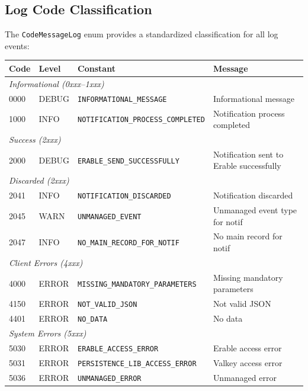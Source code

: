 \subsection{Log Code Classification}

The \texttt{CodeMessageLog} enum provides a standardized classification for all log events:

\begin{center}
    \begin{tabularx}{\textwidth}{|l|l|l|X|}
\toprule
\textbf{Code} & \textbf{Level} & \textbf{Constant} & \textbf{Message} \\
\midrule
\multicolumn{4}{|l|}{\textit{Informational (0xxx--1xxx)}} \\
\hline
0000 & DEBUG & \texttt{INFORMATIONAL\_MESSAGE} & Informational message \\ \hline
1000 & INFO & \texttt{NOTIFICATION\_PROCESS\_COMPLETED} & Notification process completed \\
\midrule
\multicolumn{4}{|l|}{\textit{Success (2xxx)}} \\
\hline
2000 & DEBUG & \texttt{ERABLE\_SEND\_SUCCESSFULLY} & Notification sent to Erable successfully \\
\midrule
\multicolumn{4}{|l|}{\textit{Discarded (2xxx)}} \\
\hline
2041 & INFO & \texttt{NOTIFICATION\_DISCARDED} & Notification discarded \\ \hline
2045 & WARN & \texttt{UNMANAGED\_EVENT} & Unmanaged event type for notif \\ \hline
2047 & INFO & \texttt{NO\_MAIN\_RECORD\_FOR\_NOTIF} & No main record for notif \\
\midrule
\multicolumn{4}{|l|}{\textit{Client Errors (4xxx)}} \\
\hline
4000 & ERROR & \texttt{MISSING\_MANDATORY\_PARAMETERS} & Missing mandatory parameters \\ \hline
4150 & ERROR & \texttt{NOT\_VALID\_JSON} & Not valid JSON \\ \hline
4401 & ERROR & \texttt{NO\_DATA} & No data \\
\midrule
\multicolumn{4}{|l|}{\textit{System Errors (5xxx)}} \\
\hline
5030 & ERROR & \texttt{ERABLE\_ACCESS\_ERROR} & Erable access error \\ \hline
5031 & ERROR & \texttt{PERSISTENCE\_LIB\_ACCESS\_ERROR} & Valkey access error \\ \hline
5036 & ERROR & \texttt{UNMANAGED\_ERROR} & Unmanaged error \\
\bottomrule
    \end{tabularx}
    \label{tab:log-codes}
\end{center}


